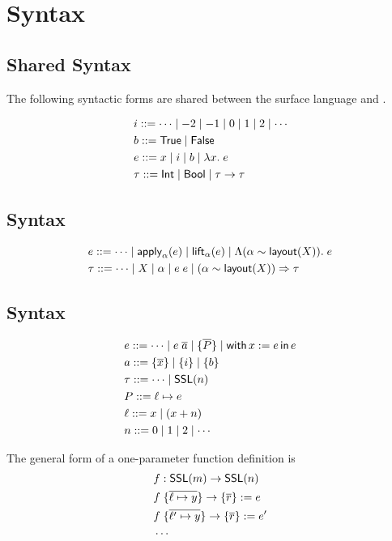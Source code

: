 \section{Syntax}

\subsection{Shared Syntax}

The following syntactic forms are shared between the \Pika{} surface language and \PikaCore.

\begin{align*}
  &i ::= \cdots \mid -2 \mid -1 \mid 0 \mid 1 \mid 2 \mid \cdots
  \\
  &b ::= \textsf{True}{} \mid \textsf{False}
  \\
  &e ::= x \mid i \mid b \mid \lambda x.\; e
  \\
  &\tau ::= \textsf{Int} \mid \textsf{Bool} \mid \tau \rightarrow \tau
\end{align*}

\subsection{\Pika{} Syntax}
\begin{align*}
  &e ::= \cdots \mid \textsf{apply}_{\alpha}(e) \mid \textsf{lift}_{\alpha}(e) \mid \Lambda (\alpha \sim \textsf{layout}(X)).\; e
  \\
  &\tau ::= \cdots \mid X \mid \alpha \mid e\; e \mid (\alpha \sim \textsf{layout}(X)) \Rightarrow \tau
\end{align*}

\subsection{\PikaCore{} Syntax}
\begin{align*}
  &e ::= \cdots \mid e\; \overline{a} \mid \{ \overline{P} \} \mid \textsf{with}\,x := e\,\textsf{in}\, e
  \\
  &a ::= \{ \overline{x} \} \mid \{ i \} \mid \{ b \}
  \\
  &\tau ::= \cdots \mid \textsf{SSL}(n)
  \\
  &P ::= \ell \mapsto e
  \\
  &\ell ::= x \mid (x + n)
  \\
  &n ::= 0 \mid 1 \mid 2 \mid \cdots
\end{align*}

The general form of a one-parameter \PikaCore{} function definition is
\begin{align*}
  &f : \textsf{SSL}(m) \rightarrow \textsf{SSL}(n)\\
  &f\; \{ \overline{\ell \mapsto y} \} \rightarrow \{ \overline{r} \} := e\\
  &f\; \{ \overline{\ell' \mapsto y} \} \rightarrow \{ \overline{r} \} := e'\\
  &\cdots
\end{align*}

